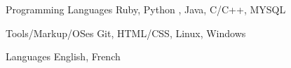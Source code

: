 

\begin{cvskills}

  \cvskill
    {Programming Languages} %
    {Ruby, Python , Java, C/C++, MYSQL} %

  \cvskill
    {Tools/Markup/OSes} %
    {Git, HTML/CSS, Linux, Windows} %

  \cvskill
    {Languages} %
    {English, French} %

\end{cvskills}